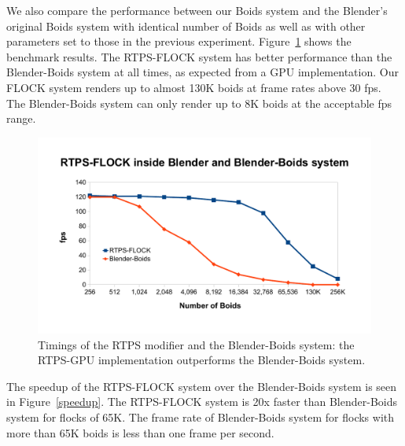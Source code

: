 We also compare the performance between our Boids system and the Blender's original Boids system with identical number of Boids as well as with other parameters set to those in the previous experiment. Figure~\ref{RTPSvsBlender} shows the benchmark results. The RTPS-FLOCK system has better performance than the Blender-Boids system at all times, as expected from a GPU implementation. Our FLOCK system renders up to almost 130K boids at frame rates above 30 fps. The Blender-Boids system can only render up to 8K boids at the acceptable fps range.

\begin{figure}[htbp]
\begin{center}
\includegraphics[scale=0.7]{figures/benchmarks.pdf}
\caption{Timings of the RTPS modifier and the Blender-Boids system: the RTPS-GPU implementation outperforms the Blender-Boids system.}
\label{RTPSvsBlender}
\end{center}
\end{figure}

The speedup of the RTPS-FLOCK system over the Blender-Boids system is seen in Figure~\ref{speedup}. The RTPS-FLOCK system is 20x faster than Blender-Boids system for flocks of 65K. The frame rate of Blender-Boids system for flocks with more than 65K boids is less than one frame per second.

